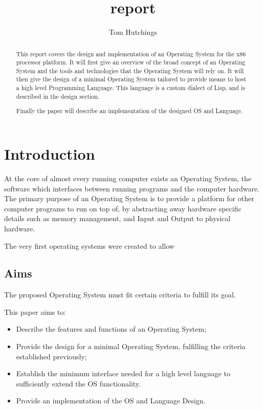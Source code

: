 \documentclass{report}
\begin{document}
\title{report}
\author{Tom Hutchings}

\maketitle

\begin{abstract}
  This report covers the design and implementation of an Operating System for the x86 processor platform. It will first give an overview of the broad concept of an Operating System and the tools and technologies that the Operating System will rely on. It will then give the design of a minimal Operating System tailored to provide means to host a high level Programming Language. This language is a custom dialect of Lisp, and is described in the design section.

  Finally the paper will describe an implementation of the designed OS and Language.
  
\end{abstract}


\tableofcontents

\newpage

\chapter{Introduction}
At the core of almost every running computer exists an Operating System, the software which interfaces between running programs and the computer hardware. The primary purpose of an Operating System is to provide a platform for other computer programs to run on top of, by abstracting away hardware specific details such as memory management, and Input and Output to physical hardware.

The very first operating systems were created to allow  \cite{10.1145/1460764.1460786} 

\section{Aims}
The proposed Operating System must fit certain criteria to fulfill its goal.

This paper aims to:
\begin{itemize}
\item Describe the features and functions of an Operating System;
\item Provide the design for a minimal Operating System, fulfilling the criteria established previously;
\item Establish the minimum interface needed for a high level language to sufficiently extend the OS functionality.
\item Provide an implementation of the OS and Language Design.
\end{itemize}
\end{document}
